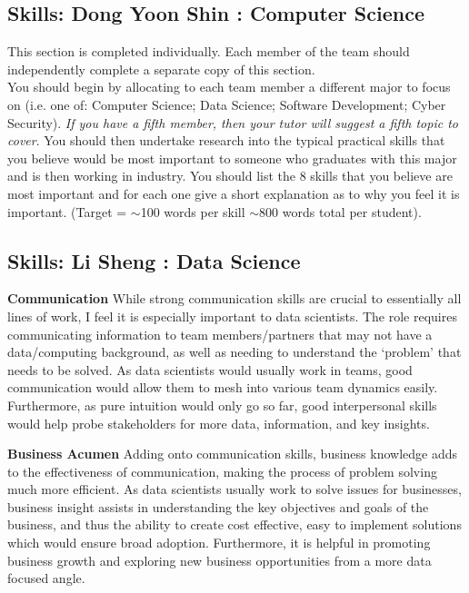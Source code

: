 \documentclass[a4paper, 11pt]{report}
\begin{document}
\subsection{Skills: Dong Yoon Shin : Computer Science}

This section is completed individually. Each member of the team should independently complete a separate copy of this section.\\
You should begin by allocating to each team member a different major to focus on (i.e. one of: Computer Science; Data Science; Software Development; Cyber Security). \textit{If you have a fifth member, then your tutor will suggest a fifth topic to cover}. You should then undertake research into the typical practical skills that you believe would be most important to someone who graduates with this major and is then working in industry. You should list the 8 skills that you believe are most important and for each one give a short explanation as to why you feel it is important. (Target = $\sim$100 words per skill $\sim$800 words total per student).


\subsection{Skills: Li Sheng : Data Science}


\textbf{Communication}
While strong communication skills are crucial to essentially all lines of work, I feel it is especially important to data scientists. The role requires communicating information to team members/partners that may not have a data/computing background, as well as needing to understand the ‘problem’ that needs to be solved. As data scientists would usually work in teams, good communication would allow them to mesh into various team dynamics easily. Furthermore, as pure intuition would only go so far, good interpersonal skills would help probe stakeholders for more data, information, and key insights.

\textbf{Business Acumen}
Adding onto communication skills, business knowledge adds to the effectiveness of communication, making the process of problem solving much more efficient. As data scientists usually work to solve issues for businesses, business insight assists in understanding the key objectives and goals of the business, and thus the ability to create cost effective, easy to implement solutions which would ensure broad adoption. Furthermore, it is helpful in promoting business growth and exploring new business opportunities from a more data focused angle.
\end{document}
